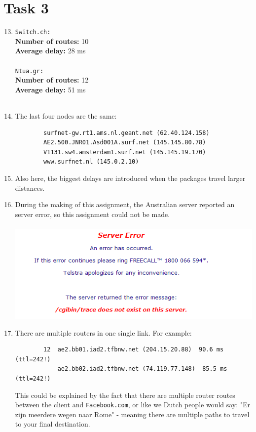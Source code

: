 \documentclass[12pt]{article}
\begin{document}
\section{Task 3}
\begin{enumerate}
	\setcounter{enumi}{12}
	\item \verb|Switch.ch:| \\
	\textbf{Number of routes:} 10 \\
	\textbf{Average delay:} 28 ms\\ \\
	\verb|Ntua.gr:| \\
	\textbf{Number of routes:} 12\\
	\textbf{Average delay:} 51 ms\\ \\
	\item The last four nodes are the same:
	\begin{verbatim}
		surfnet-gw.rt1.ams.nl.geant.net (62.40.124.158) 
		AE2.500.JNR01.Asd001A.surf.net (145.145.80.78) 
		V1131.sw4.amsterdam1.surf.net (145.145.19.170)
		www.surfnet.nl (145.0.2.10) 
	\end{verbatim}
	\item Also here, the biggest delays are introduced when the packages travel larger distances.
	\clearpage
	\item During the making of this assignment, the Australian server reported an server error, so this assignment could not be made. \\ \\
	\includegraphics{error.png}
	\item There are multiple routers in one single link. For example:
	\begin{verbatim}
		12  ae2.bb01.iad2.tfbnw.net (204.15.20.88)  90.6 ms (ttl=242!)  
		    ae2.bb02.iad2.tfbnw.net (74.119.77.148)  85.5 ms (ttl=242!)
	\end{verbatim}
	This could be explained by the fact that there are multiple router routes between the client and \verb|Facebook.com|, or like we Dutch people would say: "Er zijn meerdere wegen naar Rome" - meaning there are multiple paths to travel to your final destination.
\end{enumerate}
\end{document}
